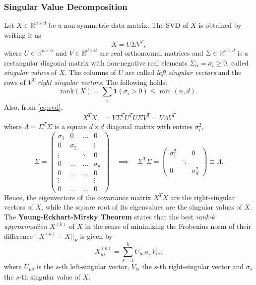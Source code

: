 \documentclass{article}
\begin{document}
\subsubsection*{Singular Value Decomposition}
Let $X \in \mathbb{R}^{n\times d}$ be a non-symmetric data matrix. The SVD of $X$ is obtained by writing it as
\begin{equation}
    X = U\Sigma V^T,
    \label{eq:svd}
\end{equation}
where $U\in \mathbb{R}^{n\times n}$ and $V\in \mathbb{R}^{d\times d}$ are real orthonormal matrices and $\Sigma \in \mathbb{R}^{n\times d}$ is a rectangular diagonal matrix with non-negative real elements $\Sigma_{ii} = \sigma_i \geq 0$, called \emph{singular values} of $X$. The columns of $U$ are called \emph{left singular vectors} and the rows of $V^T$ \emph{right singular vectors}. The following holds:
\begin{equation}
    \text{rank}(X) = \sum_{i} \mathbf{1}(\sigma_i > 0)
    \leq \min(n,d).
\end{equation}
Also, from \ref{eq:svd},
\begin{align}
    X^TX &=
    V\Sigma^T U^T U\Sigma V^T
    =
    V\Lambda V^T
\end{align}
where $\Lambda = \Sigma^T\Sigma$ is a square $d\times d$ diagonal matrix with entries $\sigma_i^2$,
\begin{equation}
    \Sigma =
    \begin{pmatrix}
        \sigma_1 & 0 & \ldots & 0 \\
        0 & \sigma_2 &  & \vdots \\
        \vdots & & \ddots & 0 \\
        0 &  \dots & \dots&   \sigma_d \\
        0 &  \dots & \dots&   0 \\
        \vdots & & &   \vdots \\
        0 &  \dots & \dots &   0
    \end{pmatrix}
    \quad \implies \quad
    \Sigma^T\Sigma =
    \begin{pmatrix}
        \sigma_1^2 &  & 0 \\
        & \ddots & \\
        0 & &\sigma_d^2
    \end{pmatrix}
    \equiv \Lambda.
\end{equation}
Hence, the eigenvectors of the covariance matrix $X^T X$ are the right-singular vectors of $X$, while the square root of its eigenvalues are the singular values of $X$. The \textbf{Young-Eckhart-Mirsky Theorem} states that the best \emph{rank-$k$ approximation} $X^{(k)}$ of $X$ in the sense of minimizing the Frobenius norm of their difference
$ || X^{(k)} - X ||_F$ is given by
\begin{equation}
    X_{\mu i}^{(k)}
    =
    \sum_{s=1}^{k} U_{\mu s} \sigma_s V_{i s},
\end{equation}
where $U_{\mu s}$ is the $s$-th left-singular vector, $V_{i s}$ the $s$-th right-singular vector and $\sigma_s$ the $s$-th singular value of $X$.
\end{document}
